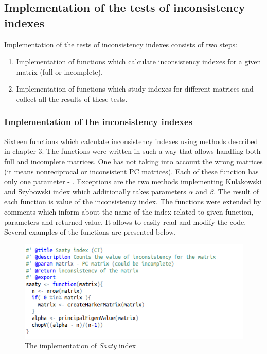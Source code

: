 \subsection{Implementation of the tests of inconsistency indexes}
Implementation of the tests of inconsistency indexes consists of two steps:
\begin{enumerate}
  \item Implementation of functions which calculate inconsistency indexes for a given matrix (full or incomplete).
  \item Implementation of functions which study indexes for different matrices and collect all the results of these tests. 
\end{enumerate}

\subsubsection{Implementation of the inconsistency indexes}
Sixteen functions which calculate inconsistency indexes using methods described in chapter 3. The functions were written in such a way that allows handling both full and incomplete matrices. One has not taking into account the wrong matrices (it means nonreciprocal or inconsistent PC matrices). Each of these function has only one parameter - . Exceptions are the two methods implementing Kulakowski and Szybowski index which additionally takes parameters $\alpha$ and $\beta$. The result of each function is value of the inconsistency index. The functions were extended by comments which inform about the name of the index related to given function, parameters and returned value. It allows to easily read and modify the code. Several examples of the functions are presented below.

\begin{figure}[h]
\centerline{\includegraphics[scale=0.75]{images/kod1.png}}
\caption{The implementation of \textit{Saaty} index}
\label{fig:rstudio}
\end{figure}

